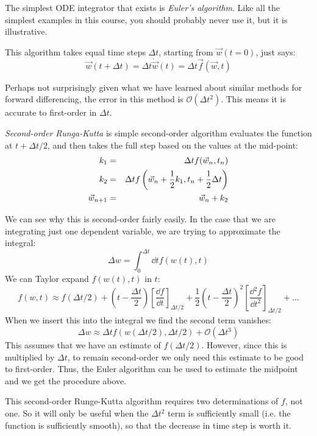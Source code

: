 The simplest ODE integrator that exists is {\it Euler's algorithm}.
Like all the simplest examples in this course, you should probably
never use it, but it is illustrative.

This algorithm takes equal time steps $\Delta t$, starting from
$\vec{w}(t=0)$, just says:
\begin{equation}
\vec{w}(t+\Delta t) = \Delta t {\dot{\vec{w}}}(t) = 
\Delta t \vec{f}(\vec{w}, t)
\end{equation}

Perhaps not surprisingly given what we have learned about similar
methods for forward differencing, the error in this method is
$\mathcal{O}(\Delta t^2)$. This means it is accurate to first-order in
$\Delta t$. 

{\it Second-order Runga-Kutta} is simple second-order algorithm
evaluates the function at $t+\Delta t /2$, and then takes the full
step based on the values at the mid-point:
\begin{eqnarray}
k_1 &=& \Delta t f(\vec{w}_n, t_n) \cr
k_2 &=& \Delta t f\left(\vec{w}_n + \frac{1}{2} k_1,
t_n + \frac{1}{2}\Delta t\right) \cr
\vec{w}_{n+1} &=& \vec{w}_n + k_2
\end{eqnarray}

We can see why this is second-order fairly easily. In the case that we
are integrating just one dependent variable, we are trying to
approximate the integral:
\begin{equation}
\Delta w = \int_0^{\Delta t} \dd{t} f(w(t), t)
\end{equation}
We can Taylor expand $f(w(t), t)$ in $t$:
\begin{equation}
  f(w, t) \approx f\left(\Delta t /2\right) +
  \left(t - \frac{\Delta t}{2}\right) \left[\frac{\dd{f}}{\dd{t}}\right]_{\Delta t /2} + 
  \frac{1}{2} \left(t - \frac{\Delta t}{2}\right)^2
  \left[\frac{\dd{^2f}}{\dd{t}^2}\right]_{\Delta t /2}   + \ldots
\end{equation}
When we insert this into the integral we find the second term vanishes:
\begin{equation}
\Delta w \approx \Delta t f(w(\Delta t /2), \Delta t /2) +
\mathcal{O}(\Delta t^3)
\end{equation}
This assumes that we have an estimate of $f(\Delta t /2)$.  However,
since this is multiplied by $\Delta t$, to remain second-order we only
need this estimate to be good to first-order. Thus, the Euler
algorithm can be used to estimate the midpoint and we get the
procedure above.

This second-order Runge-Kutta algorithm requires two determinations of
$f$, not one. So it will only be useful when the $\Delta t^2$ term is
sufficiently small (i.e. the function is sufficiently smooth), so that
the decrease in time step is worth it.  

